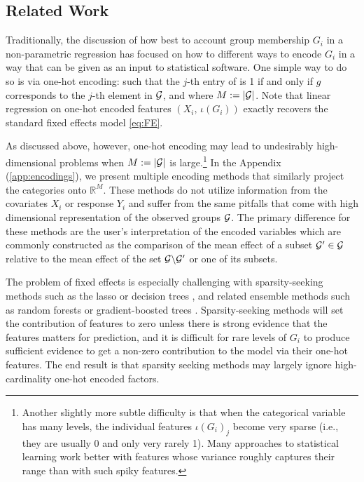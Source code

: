 \documentclass{article}
\theoremstyle{plain}
\theoremstyle{definition}
\theoremstyle{remark}
\begin{document}
\subsection{Related Work}
\label{subsec:related_work}

Traditionally, the discussion of how best to account group membership $G_i$ in a non-parametric regression
has focused on how to different ways to encode $G_i$ in a way that can be given as an input to
statistical software. One simple way to do so is via one-hot encoding:
 such that the $j$-th entry of 
is 1 if and only if $g$ corresponds to the $j$-th element in $\mathcal{G}$, and where $M := {\left\lvert\mathcal{G}\right\rvert}$. Note that linear regression on
one-hot encoded features $(X_i, \, \iota(G_i))$ exactly recovers the standard fixed effects model
\eqref{eq:FE}.

As discussed above, however, one-hot encoding may lead to undesirably high-dimensional problems
when $M := \left\lvert\mathcal{G}\right\rvert$ is large.\footnote{Another slightly more subtle difficulty is that when the categorical
variable has many levels, the individual features $\iota(G_i)_j$ become very sparse (i.e., they are usually
0 and only very rarely 1). Many approaches to statistical learning work better with features whose
variance roughly captures their range than with such spiky features.} In the Appendix (\ref{app:encodings}),
we present multiple encoding methods that similarly project the categories onto $\mathbb{R}^{M}$.
These methods do not utilize information from the covariates $X_i$ or response $Y_i$ and suffer from the same pitfalls that
come with high dimensional representation of the observed groups $\mathcal{G}$. The primary difference for
these methods are the user's interpretation of the encoded variables which are commonly constructed as the comparison of
 the mean effect of a subset $\mathcal{G}' \in \mathcal{G}$ relative to the mean effect of the set $\mathcal{G} \backslash \mathcal{G}'$ or one of its subsets.


The problem of fixed effects is especially challenging with sparsity-seeking methods such as the
lasso \citep{hastie2015statistical} or decision trees \citep{breiman1984classification}, and related
ensemble methods such as random forests \citep{breiman2001random} or gradient-boosted
trees \citep{friedman2001greedy}. Sparsity-seeking methods will set the contribution of features
to zero unless there is strong evidence that the features matters for prediction, and it is difficult
for rare levels of $G_i$ to produce sufficient evidence to get a non-zero contribution to the model
via their one-hot features. The end result is that sparsity seeking methods may largely ignore high-cardinality
one-hot encoded factors.
\end{document}
